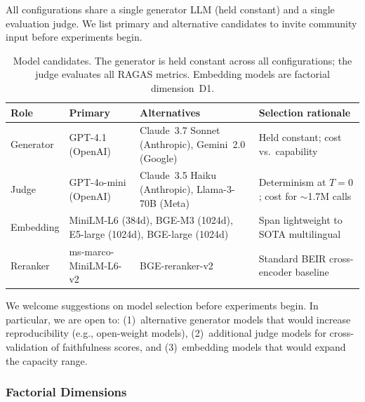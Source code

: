 All configurations share a single generator LLM (held constant) and a
single evaluation judge.  We list primary and alternative candidates
to invite community input before experiments begin.

\begin{table}[h]
\centering
\footnotesize
\caption{Model candidates.  The generator is held constant across all
  configurations; the judge evaluates all RAGAS metrics.  Embedding
  models are factorial dimension~D1.}
\label{prereg:tab:models}
\begin{tabular}{@{}p{2.0cm}p{3.4cm}p{3.8cm}p{4.0cm}@{}}
\toprule
\textbf{Role} & \textbf{Primary} & \textbf{Alternatives} & \textbf{Selection rationale} \\
\midrule
Generator    & GPT-4.1 (OpenAI)
             & Claude~3.7 Sonnet (Anthropic), Gemini~2.0 (Google)
             & Held constant; cost vs.\ capability \\
\addlinespace
Judge        & GPT-4o-mini (OpenAI)
             & Claude~3.5 Haiku (Anthropic), Llama-3-70B (Meta)
             & Determinism at $T{=}0$; cost for ${\sim}$1.7M calls \\
\addlinespace
Embedding    & \multicolumn{2}{l}{MiniLM-L6 (384d), BGE-M3 (1024d), E5-large (1024d), BGE-large (1024d)}
             & Span lightweight to SOTA multilingual \\
\addlinespace
Reranker     & ms-marco-MiniLM-L6-v2
             & BGE-reranker-v2
             & Standard BEIR cross-encoder baseline \\
\bottomrule
\end{tabular}
\end{table}

We welcome suggestions on model selection before experiments begin.
In particular, we are open to: (1)~alternative generator models that
would increase reproducibility (e.g., open-weight models),
(2)~additional judge models for cross-validation of faithfulness
scores, and (3)~embedding models that would expand the capacity range.

\subsubsection{Factorial Dimensions}

